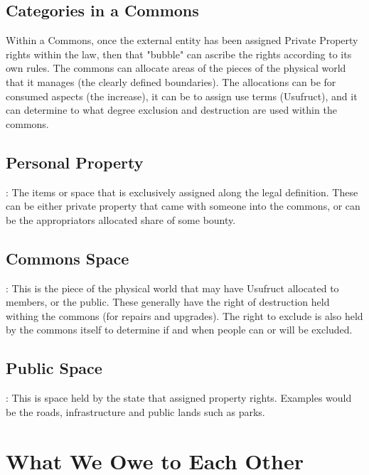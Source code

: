 \documentclass{article}
\begin{document}
\subsection{Categories in a Commons}

Within a Commons, once the external entity has been assigned Private Property rights within the law, then that "bubble" can ascribe the rights according to its own rules. The commons can allocate areas of the pieces of the physical world that it manages (the clearly defined boundaries). The allocations can be for consumed aspects (the increase), it can be to assign use terms (Usufruct), and it can determine to what degree exclusion and destruction are used within the commons.


\subsection{Personal Property}: The items or space that is exclusively assigned along the legal definition. These can be either private property that came with someone into the commons, or can be the appropriators allocated share of some bounty. 


\subsection{Commons Space}: This is the piece of the physical world that may have Usufruct allocated to members, or the public. These generally have the right of destruction held withing the commons (for repairs and upgrades). The right to exclude is also held by the commons itself to determine if and when people can or will be excluded. 
 
\subsection{Public Space}: This is space held by the state that assigned property rights. Examples would be the roads, infrastructure and public lands such as parks. 



\pagebreak
{\section{What We Owe to Each Other}}
\end{document}
